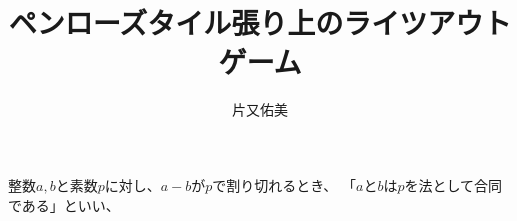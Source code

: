 \documentclass[uplatex,dvipdfmx]{ujreport}
\author{片又佑美}
\title{ペンローズタイル張り上のライツアウトゲーム}
\begin{document}
\pagestyle{empty}
\thispagestyle{empty}
整数$a,b$と素数$p$に対し、$a-b$が$p$で割り切れるとき、
「$a$と$b$は$p$を法として合同である」といい、
\end{document}
